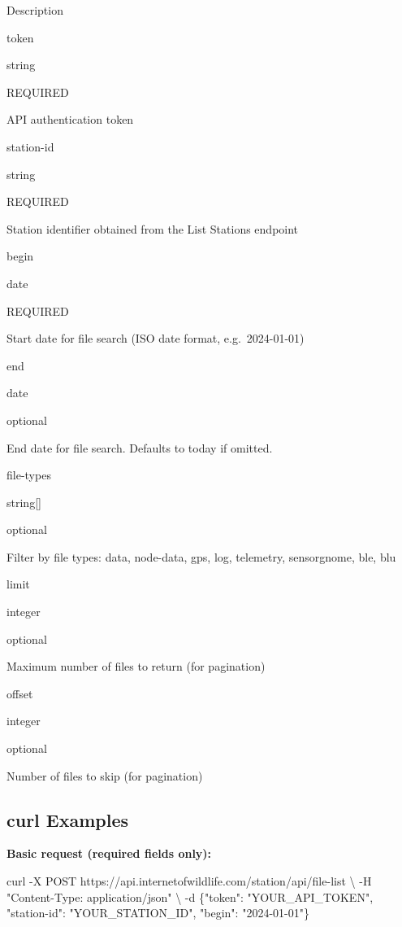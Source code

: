 \documentclass[
]{book}
\newenvironment{Shaded}{\begin{snugshade}}{\end{snugshade}}
\newcommand{\AttributeTok}[1]{\textcolor[rgb]{0.13,0.29,0.53}{#1}}
\newcommand{\DataTypeTok}[1]{\textcolor[rgb]{0.13,0.29,0.53}{#1}}
\newcommand{\ExtensionTok}[1]{#1}
\newcommand{\NormalTok}[1]{#1}
\newcommand{\StringTok}[1]{\textcolor[rgb]{0.31,0.60,0.02}{#1}}
\begin{document}
Description

token

{string}

{REQUIRED}

API authentication token

station-id

{string}

{REQUIRED}

Station identifier obtained from the List Stations endpoint

begin

{date}

{REQUIRED}

Start date for file search (ISO date format, e.g.~2024-01-01)

end

{date}

{optional}

End date for file search. Defaults to today if omitted.

file-types

{string{[}{]}}

{optional}

Filter by file types: data, node-data, gps, log, telemetry, sensorgnome, ble, blu

limit

{integer}

{optional}

Maximum number of files to return (for pagination)

offset

{integer}

{optional}

Number of files to skip (for pagination)

\subsection{curl Examples}\label{curl-examples}

\textbf{Basic request (required fields only):}

\begin{Shaded}
\begin{Highlighting}[]
\ExtensionTok{curl} \AttributeTok{{-}X}\NormalTok{ POST https://api.internetofwildlife.com/station/api/file{-}list }\DataTypeTok{\textbackslash{}}
  \AttributeTok{{-}H} \StringTok{"Content{-}Type: application/json"} \DataTypeTok{\textbackslash{}}
  \AttributeTok{{-}d} \StringTok{\textquotesingle{}\{"token": "YOUR\_API\_TOKEN", "station{-}id": "YOUR\_STATION\_ID", "begin": "2024{-}01{-}01"\}\textquotesingle{}}
\end{Highlighting}
\end{Shaded}
\end{document}
